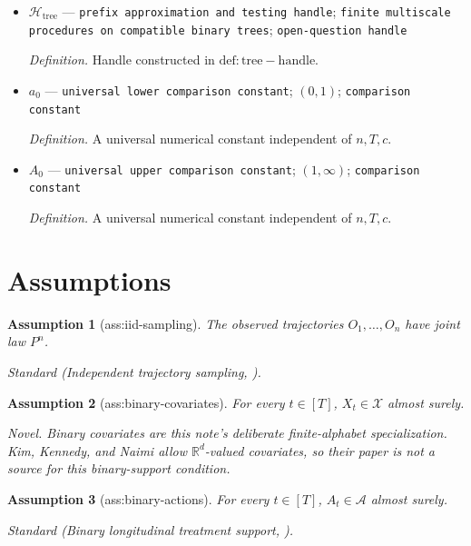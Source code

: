 \documentclass{article}
\newtheorem{assumption}{Assumption}
\begin{document}
\begin{itemize}
  \par\smallskip\noindent\emph{Definition.} Connected interval output requested in \(\mathrm{oeq:sharp-frontier}\).
  \item \(\mathscr H_{\mathrm{tree}}\) --- \texttt{prefix approximation and testing handle}; \texttt{finite multiscale procedures on compatible binary trees}; \texttt{open-\allowbreak{}question handle}
  \par\smallskip\noindent\emph{Definition.} Handle constructed in \(\mathrm{def:tree-handle}\).
  \item \(a_0\) --- \texttt{universal lower comparison constant}; \((0,1)\); \texttt{comparison constant}
  \par\smallskip\noindent\emph{Definition.} A universal numerical constant independent of \(n,T,c\).
  \item \(A_0\) --- \texttt{universal upper comparison constant}; \((1,\infty)\); \texttt{comparison constant}
  \par\smallskip\noindent\emph{Definition.} A universal numerical constant independent of \(n,T,c\).
\end{itemize}

\section{Assumptions}

\begin{assumption}[ass:iid-sampling]\label{ass:iid-sampling}
The observed trajectories \(O_1,\ldots,O_n\) have joint law \(P^n\).
\par\smallskip\noindent\emph{Standard} (Independent trajectory sampling, \cite{KimKennedyNaimi2021}).
\end{assumption}

\begin{assumption}[ass:binary-covariates]\label{ass:binary-covariates}
For every \(t\in[T]\), \(X_t\in\mathcal X\) almost surely.
\par\smallskip\noindent\emph{Novel.} Binary covariates are this note's deliberate finite-alphabet specialization. Kim, Kennedy, and Naimi allow \(\mathbb R^d\)-valued covariates, so their paper is not a source for this binary-support condition.
\end{assumption}

\begin{assumption}[ass:binary-actions]\label{ass:binary-actions}
For every \(t\in[T]\), \(A_t\in\mathcal A\) almost surely.
\par\smallskip\noindent\emph{Standard} (Binary longitudinal treatment support, \cite{KimKennedyNaimi2021}).
\end{assumption}
\end{document}
